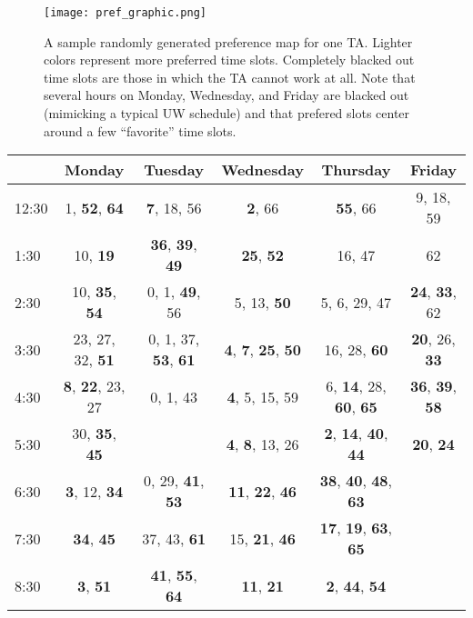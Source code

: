 \documentclass{article}
\begin{document}
\begin{multicols}{2}
\begin{figure*}
\centering
\texttt{[image: pref\_graphic.png]}
\caption{\small{A sample randomly generated preference map for one TA. Lighter colors represent more preferred time slots. Completely blacked out time slots are those in which the TA cannot work at all. Note that several hours on Monday, Wednesday, and Friday are blacked out (mimicking a typical UW schedule) and that prefered slots center around a few ``favorite'' time slots.}}
\end{figure*}

\def\arraystretch{1.5}
\begin{table*}[ht]
\small
   \centering
   \begin{tabular}{ l | c | c | c | c | c }
& Monday & Tuesday & Wednesday & Thursday & Friday \\ \hline
12:30 & 1, \textbf{52}, \textbf{64} & \textbf{7}, 18, 56 & \textbf{2}, 66 & \textbf{55}, 66 & 9, 18, 59 \\
1:30 & 10, \textbf{19} & \textbf{36}, \textbf{39}, \textbf{49} & \textbf{25}, \textbf{52} & 16, 47 & 62 \\
2:30 & 10, \textbf{35}, \textbf{54} & 0, 1, \textbf{49}, 56 & 5, 13, \textbf{50} & 5, 6, 29, 47 & \textbf{24}, \textbf{33}, 62 \\
3:30 & 23, 27, 32, \textbf{51} & 0, 1, 37, \textbf{53}, \textbf{61} & \textbf{4}, \textbf{7}, \textbf{25}, \textbf{50} & 16, 28, \textbf{60} & \textbf{20}, 26, \textbf{33} \\
4:30 & \textbf{8}, \textbf{22}, 23, 27 & 0, 1, 43 & \textbf{4}, 5, 15, 59 & 6, \textbf{14}, 28, \textbf{60}, \textbf{65} & \textbf{36}, \textbf{39}, \textbf{58} \\
5:30 & 30, \textbf{35}, \textbf{45} &  & \textbf{4}, \textbf{8}, 13, 26 & \textbf{2}, \textbf{14}, \textbf{40}, \textbf{44} & \textbf{20}, \textbf{24} \\
6:30 & \textbf{3}, 12, \textbf{34} & 0, 29, \textbf{41}, \textbf{53} & \textbf{11}, \textbf{22}, \textbf{46} & \textbf{38}, \textbf{40}, \textbf{48}, \textbf{63} &  \\
7:30 & \textbf{34}, \textbf{45} & 37, 43, \textbf{61} & 15, \textbf{21}, \textbf{46} & \textbf{17}, \textbf{19}, \textbf{63}, \textbf{65} &  \\
8:30 & \textbf{3}, \textbf{51} & \textbf{41}, \textbf{55}, \textbf{64} & \textbf{11}, \textbf{21} & \textbf{2}, \textbf{44}, \textbf{54} &  \\
   \end{tabular}
   \\[10pt]

\end{table*}
\end{multicols}
\end{document}
